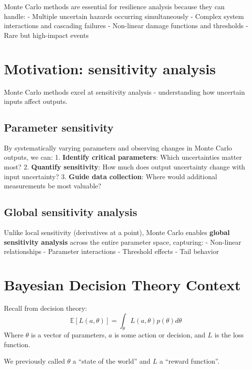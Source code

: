\documentclass[
  letterpaper,
  DIV=11,
  numbers=noendperiod]{scrreprt}
\begin{document}
Monte Carlo methods are essential for resilience analysis because they
can handle: - Multiple uncertain hazards occurring simultaneously -
Complex system interactions and cascading failures - Non-linear damage
functions and thresholds - Rare but high-impact events

\section{Motivation: sensitivity
analysis}\label{motivation-sensitivity-analysis}

Monte Carlo methods excel at sensitivity analysis - understanding how
uncertain inputs affect outputs.

\subsection{Parameter sensitivity}\label{parameter-sensitivity}

By systematically varying parameters and observing changes in Monte
Carlo outputs, we can: 1. \textbf{Identify critical parameters}: Which
uncertainties matter most? 2. \textbf{Quantify sensitivity}: How much
does output uncertainty change with input uncertainty? 3. \textbf{Guide
data collection}: Where would additional measurements be most valuable?

\subsection{Global sensitivity
analysis}\label{global-sensitivity-analysis}

Unlike local sensitivity (derivatives at a point), Monte Carlo enables
\textbf{global sensitivity analysis} across the entire parameter space,
capturing: - Non-linear relationships - Parameter interactions -
Threshold effects - Tail behavior

\section{Bayesian Decision Theory
Context}\label{bayesian-decision-theory-context}

Recall from decision theory: \[
\mathbb{E}\left[L(a, \theta) \right] = \int_\theta L(a, \theta) p(\theta) d\theta
\] Where \(\theta\) is a vector of parameters, \(a\) is some action or
decision, and \(L\) is the loss function.

\begin{tcolorbox}[enhanced jigsaw, arc=.35mm, breakable, title=\textcolor{quarto-callout-note-color}{\faInfo}\hspace{0.5em}{Note}, coltitle=black, opacityback=0, bottomtitle=1mm, colback=white, left=2mm, opacitybacktitle=0.6, toptitle=1mm, colframe=quarto-callout-note-color-frame, leftrule=.75mm, titlerule=0mm, rightrule=.15mm, bottomrule=.15mm, colbacktitle=quarto-callout-note-color!10!white, toprule=.15mm]

We previously called \(\theta\) a ``state of the world'' and \(L\) a
``reward function''.

\end{tcolorbox}
\end{document}
